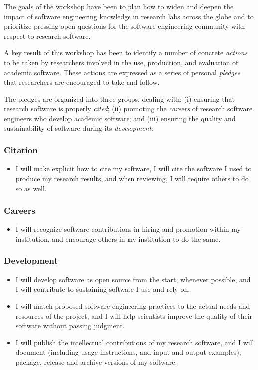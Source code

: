 \documentclass[a4paper,UKenglish]{dagman}
\renewcommand{\paragraph}[1]{\subsubsection*{#1}\xspace}
\begin{document}
The goals of the workshop have been to plan how to widen and deepen the impact of software engineering knowledge in research labs across the globe and to prioritize pressing open questions for the software engineering community with respect to research software.

A key result of this workshop has been to identify a number of concrete \emph{actions} to be taken by researchers involved in the use, production, and evaluation of academic software. These actions are expressed as a series of personal \emph{pledges} that researchers are encouraged to take and follow.

The pledges are organized into three groups, dealing with:
(i) ensuring that research software is properly \emph{cited};
(ii) promoting the \emph{careers} of research software engineers who develop academic software;
and
(iii) ensuring the quality and sustainability of software during its \emph{development}:

\paragraph{Citation}
\begin{itemize}
\item I will make explicit how to cite my software, I will cite the software I used to produce my research results, and when reviewing, I will require others to do so as well.
\end{itemize}

\paragraph{Careers}
\begin{itemize}
\item I will recognize software contributions in hiring and promotion within my institution, and encourage others in my institution to do the same.
\end{itemize}

\paragraph{Development}
\begin{itemize}
\item I will develop software as open source from the start, whenever possible, and I will contribute to sustaining software I use and rely on.
\item I will match proposed software engineering practices to the actual needs and resources of the project, and I will help scientists improve the quality of their software without passing judgment.
\item I will publish the intellectual contributions of my research software, and I will document (including usage instructions, and input and output examples), package, release and archive versions of my software.
\end{itemize}
\end{document}
